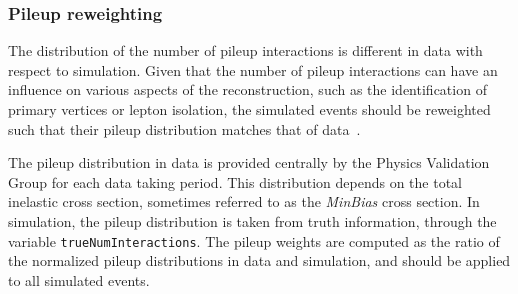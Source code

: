 
\subsubsection{Pileup reweighting \label{sec:event_pileup}}

The distribution of the number of pileup interactions is different in data with respect to
simulation. Given that the number of pileup interactions can have an influence on various aspects of
the reconstruction, such as the identification of primary vertices or lepton isolation, 
the simulated events should be reweighted such that their pileup distribution matches that of
data~\cite{pileup_twiki}.

The pileup distribution in data is provided centrally by the Physics Validation Group for each
data taking period. This distribution depends on the total \Pp\Pp inelastic cross section, sometimes
referred to as the \textit{MinBias} cross section. 
In simulation, the pileup distribution is taken from truth information, through the variable
\texttt{trueNumInteractions}. 
The pileup weights are computed as the ratio of the normalized pileup distributions in data and
simulation, and should be applied to all simulated events. 


